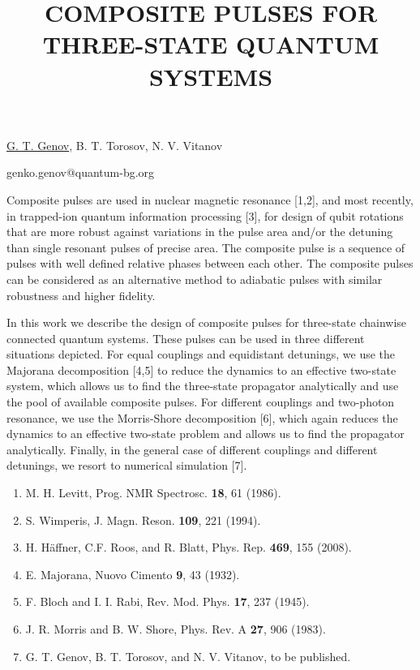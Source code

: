 \title{COMPOSITE PULSES FOR THREE-STATE QUANTUM SYSTEMS}

\underline{G. T. Genov}, B. T. Torosov, N. V. Vitanov  

{\normalsize{\vspace{-4mm}
\unisofia

\email genko.genov@quantum-bg.org}}

Composite pulses are used in nuclear magnetic resonance [1,2], and most recently, in trapped-ion quantum information processing [3], for design of qubit rotations that are more robust against variations in the pulse area and/or the detuning than single resonant pulses of precise area. The composite pulse is a sequence of pulses with well defined relative phases between each other. The composite pulses can be considered as an alternative method to adiabatic pulses with similar robustness and higher fidelity.

In this work we describe the design of composite pulses for three-state chainwise connected quantum systems. These pulses can be used in three different situations depicted. For equal couplings and equidistant detunings, we use the Majorana decomposition [4,5] to reduce the dynamics to an effective two-state system, which allows us to find the three-state propagator analytically and use the pool of available composite pulses. For different couplings and two-photon resonance, we use the Morris-Shore decomposition [6], which again reduces the dynamics to an effective two-state problem and allows us to find the propagator analytically. Finally, in the general case of different couplings and different detunings, we resort to numerical simulation [7].

\begin{enumerate}
\item M. H. Levitt, Prog. NMR Spectrosc. \textbf{18}, 61 (1986).
\item S. Wimperis, J. Magn. Reson. \textbf{109}, 221 (1994).
\item H. H\"{a}ffner, C.F. Roos, and R. Blatt, Phys. Rep. \textbf{469}, 155 (2008).
\item E. Majorana, Nuovo Cimento \textbf{9}, 43 (1932).
\item F. Bloch and I. I. Rabi, Rev. Mod. Phys. \textbf{17}, 237 (1945).
\item J. R. Morris and B. W. Shore, Phys. Rev. A \textbf{27}, 906 (1983).
\item G. T. Genov, B. T. Torosov, and N. V. Vitanov, to be published.
\end{enumerate}

\vspace{\baselineskip} 